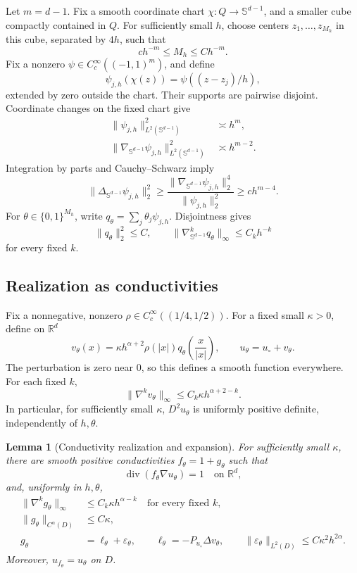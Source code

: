 \documentclass[11pt]{article}
\newtheorem{lemma}[theorem]{Lemma}
\theoremstyle{remark}
\newcommand{\R}{\mathbb R}
\newcommand{\Sph}{\mathbb S^{d-1}}
\DeclareMathOperator{\divergence}{div}
\begin{document}
Let \(m=d-1\). Fix a smooth coordinate chart
\(\chi:Q\to\Sph\), and a smaller cube compactly contained in \(Q\).
For sufficiently small \(h\), choose centers \(z_1,\ldots,z_{M_h}\)
in this cube, separated by \(4h\), such that
\[
c h^{-m}\leq M_h\leq C h^{-m}.
\]
Fix a nonzero \(\psi\in C^\infty_c((-1,1)^m)\), and define
\[
\psi_{j,h}(\chi(z))=\psi((z-z_j)/h),
\]
extended by zero outside the chart. Their supports are pairwise
disjoint. Coordinate changes on the fixed chart give
\begin{align}
\|\psi_{j,h}\|_{L^2(\Sph)}^2&\asymp h^m,\label{eq:angular-L2}\\
\|\nabla_{\Sph}\psi_{j,h}\|_{L^2(\Sph)}^2&\asymp h^{m-2}.
\label{eq:angular-grad}
\end{align}
Integration by parts and Cauchy--Schwarz imply
\begin{equation}\label{eq:angular-lap}
\|\Delta_{\Sph}\psi_{j,h}\|_2^2
\geq
\frac{\|\nabla_{\Sph}\psi_{j,h}\|_2^4}
{\|\psi_{j,h}\|_2^2}
\geq c h^{m-4}.
\end{equation}
For \(\theta\in\{0,1\}^{M_h}\), write
\(q_\theta=\sum_j\theta_j\psi_{j,h}\).
Disjointness gives
\[
\|q_\theta\|_2^2\leq C,\qquad
\|\nabla_{\Sph}^kq_\theta\|_\infty\leq C_k h^{-k}
\]
for every fixed \(k\).

\subsection{Realization as conductivities}

Fix a nonnegative, nonzero
\(\rho\in C^\infty_c((1/4,1/2))\).
For a fixed small \(\kappa>0\), define on \(\R^d\)
\[
v_\theta(x)=
\kappa h^{\alpha+2}\rho(|x|)
q_\theta\!\left(\frac{x}{|x|}\right),
\qquad
u_\theta=u_\circ+v_\theta.
\]
The perturbation is zero near \(0\), so this defines a smooth
function everywhere. For each fixed \(k\),
\begin{equation}\label{eq:v-derivatives}
\|\nabla^kv_\theta\|_\infty
\leq C_k\kappa h^{\alpha+2-k}.
\end{equation}
In particular, for sufficiently small \(\kappa\),
\(D^2u_\theta\) is uniformly positive definite, independently of
\(h,\theta\).

\begin{lemma}[Conductivity realization and expansion]\label{lem:realization}
For sufficiently small \(\kappa\), there are smooth positive
conductivities \(f_\theta=1+g_\theta\) such that
\[
\divergence(f_\theta\nabla u_\theta)=1
\quad\text{on }\R^d,
\]
and, uniformly in \(h,\theta\),
\begin{align}
\|\nabla^kg_\theta\|_\infty
&\leq C_k\kappa h^{\alpha-k}
\quad\text{for every fixed }k,\label{eq:g-derivatives}\\
\|g_\theta\|_{C^\alpha(D)}
&\leq C\kappa,\label{eq:g-class}\\
g_\theta&=\ell_\theta+\varepsilon_\theta,\qquad
\ell_\theta=-P_{u_\circ}\Delta v_\theta,\qquad
\|\varepsilon_\theta\|_{L^2(D)}
\leq C\kappa^2h^{2\alpha}.
\label{eq:lower-expansion}
\end{align}
Moreover, \(u_{f_\theta}=u_\theta\) on \(D\).
\end{lemma}
\end{document}
